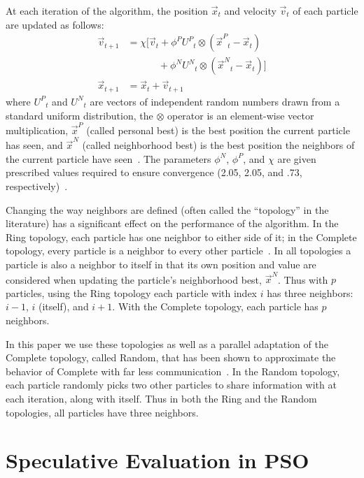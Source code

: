 \documentclass[journal,letterpaper]{IEEEtran}
\providecommand{\pers}{\ensuremath{P}}
\providecommand{\neigh}{\ensuremath{N}}
\providecommand{\nURand}{\ensuremath{U^\neigh}}
\providecommand{\pURand}{\ensuremath{U^\pers}}
\providecommand{\ppos}{\ensuremath{\Vec{x}}}
\providecommand{\pvel}{\ensuremath{\Vec{v}}}
\providecommand{\nbest}{\ensuremath{\Vec{x}^\neigh}}
\providecommand{\pbest}{\ensuremath{\Vec{x}^\pers}}
\providecommand{\constriction}{\ensuremath{\chi}}
\providecommand{\ncoeff}{\ensuremath{\phi^\neigh}}
\providecommand{\pcoeff}{\ensuremath{\phi^\pers}}
\begin{document}
At each iteration of the algorithm, the position $\ppos_t$ and velocity
$\pvel_t$ of each particle are updated as follows:
\begin{align}
\nonumber
	\pvel_{t+1} &=
		\constriction \bigl[ \pvel_t
			+ \pcoeff\pURand_{t}\otimes(\pbest_{t} - \ppos_{t}) \\
\label{eq:velupdate}
			& \quad \quad \quad \, + \ncoeff\nURand_{t}\otimes(\nbest_{t} - \ppos_{t})
		\bigr] \\
\label{eq:posupdate}
	\ppos_{t+1} &= \ppos_{t} + \pvel_{t+1}
\end{align}
where \( \pURand_{t} \) and \( \nURand_{t} \) are vectors of independent random
numbers drawn from a standard uniform distribution, the \( \otimes \) operator
is an element-wise vector multiplication, $\pbest$ (called personal best) is
the best position the current particle has seen, and $\nbest$ (called
neighborhood best) is the best position the neighbors of the current particle
have seen~\cite{bratton-2007-defining-a-standard-for-pso}.  The parameters \(
\ncoeff \), \( \pcoeff \), and \( \constriction \) are given prescribed values
required to ensure convergence (2.05, 2.05, and .73,
respectively)~\cite{clerc-2002-constricted-pso}. 

Changing the way neighbors are defined (often called the ``topology'' in the
literature) has a significant effect on the performance of the algorithm.  In
the Ring topology, each particle has one neighbor to either side of it; in the
Complete topology, every particle is a neighbor to every other
particle~\cite{bratton-2007-defining-a-standard-for-pso}.  In all topologies a
particle is also a neighbor to itself in that its own position and value are
considered when updating the particle's neighborhood best, $\nbest$.  Thus with
$p$ particles, using the Ring topology each particle with index $i$ has three
neighbors: $i-1$, $i$ (itself), and $i+1$.  With the Complete topology, each
particle has $p$ neighbors.

In this paper we use these topologies as well as a parallel adaptation of the
Complete topology, called Random, that has been shown to approximate the
behavior of Complete with far less
communication~\cite{mcnabb-2009-large-particle-swarms}.  In the Random
topology, each particle randomly picks two other particles to share information
with at each iteration, along with itself.  Thus in both the Ring and the
Random topologies, all particles have three neighbors.

\section{Speculative Evaluation in PSO}
\label{sec:sepso}
\end{document}
